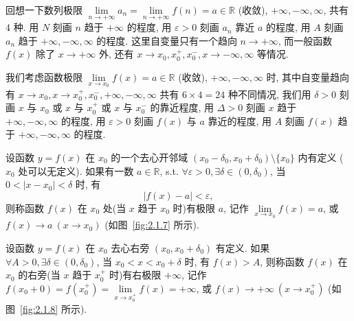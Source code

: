 回想一下数列极限 $\lim\limits_{n\to+\infty}a_n=\lim\limits_{n\to+\infty}f(n)=a\in\mathbb{R}$ (收敛), $+\infty, -\infty, \infty$, 共有 4 种. 用 $N$ 刻画 $n$ 趋于 $+\infty$ 的程度, 用 $\varepsilon>0$ 刻画 $a_n$ 靠近 $a$ 的程度, 用 $A$ 刻画 $a_n$ 趋于 $+\infty, -\infty, \infty$ 的程度. 这里自变量只有一个趋向 $n\to+\infty$, 而一般函数 $f(x)$ 除了 $x\to+\infty$ 外, 还有 $x\to x_0, x_0^+, x_0^-, x\to-\infty, \infty$ 等情况.

我们考虑函数极限 $\lim\limits_{x \to x_{0}} f(x) = a \in \mathbb{R}$ (收敛), $+\infty, -\infty, \infty$ 时, 其中自变量趋向有 $x \to x_{0}, x \to x_{0}^{+}, x_{0}^{-}, +\infty, -\infty, \infty$ 共有 $6 \times 4 = 24$ 种不同情况, 我们用 $\delta > 0$ 刻画 $x$ 与 $x_{0}$ 或 $x$ 与 $x_{0}^{+}$ 或 $x$ 与 $x_{0}^{-}$ 的靠近程度, 用 $\Delta > 0$ 刻画 $x$ 趋于 $+\infty, -\infty, \infty$ 的程度, 用 $\varepsilon > 0$ 刻画 $f(x)$ 与 $a$ 靠近的程度, 用 $A$ 刻画 $f(x)$ 趋于 $+\infty, -\infty, \infty$ 的程度.

\begin{definition}\label{def:2.1.3}
设函数 $y = f(x)$ 在 $x_{0}$ 的一个去心开邻域 $(x_{0} - \delta_{0}, x_{0} + \delta_{0}) \setminus \{x_{0}\}$ 内有定义 ($x_{0}$ 处可以无定义). 如果有一数 $a \in \mathbb{R}$, s.t. $\forall \varepsilon > 0, \exists \delta \in (0, \delta_{0})$, 当 $0 < |x - x_{0}| < \delta$ 时, 有
\[
|f(x)-a|<\varepsilon,
\]
则称函数 $f(x)$ 在 $x_{0}$ 处(当 $x$ 趋于 $x_{0}$ 时)有极限 $a$, 记作 $\lim\limits_{x \to x_{0}} f(x) = a$, 或 $f(x) \to a\ (x \to x_{0})$ (如图~\ref{fig:2.1.7} 所示).

设函数 $y = f(x)$ 在 $x_{0}$ 去心右旁 $(x_{0}, x_{0} + \delta_{0})$ 有定义. 如果 $\forall A > 0, \exists \delta \in (0, \delta_{0})$, 当 $x_{0} < x < x_{0} + \delta$ 时, 有 $f(x) > A$, 则称函数 $f(x)$ 在 $x_{0}$ 的右旁(当 $x$ 趋于 $x_{0}^{+}$ 时)有右极限 $+\infty$, 记作 $f(x_{0} + 0) = f(x_{0}^{+}) = \lim\limits_{x \to x_{0}^{+}} f(x) = +\infty$, 或 $f(x) \to +\infty\ (x \to x_{0}^{+})$ (如图~\ref{fig:2.1.8} 所示).
\end{definition}

